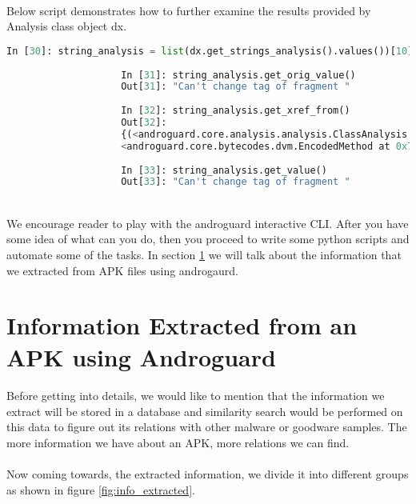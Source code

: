 \documentclass[../main.tex]{subfile}
\begin{document}
			\paragraph{} Below script demonstrates how to further examine the results provided by Analysis class object dx.
				\begin{lstlisting}[language=python]
					In [30]: string_analysis = list(dx.get_strings_analysis().values())[10]
										
					In [31]: string_analysis.get_orig_value()
					Out[31]: "Can't change tag of fragment "
					
					In [32]: string_analysis.get_xref_from()
					Out[32]: 
					{(<androguard.core.analysis.analysis.ClassAnalysis at 0x7fd62588d320>,
					<androguard.core.bytecodes.dvm.EncodedMethod at 0x7fd626197b00>)}
					
					In [33]: string_analysis.get_value()
					Out[33]: "Can't change tag of fragment "
					
				\end{lstlisting}
				
			\paragraph{} We encourage reader to play with the androguard interactive CLI. After you have some idea of what can you do, then you proceed to write some python scripts and automate some of the tasks. In section \ref{sec:androgaurd_static_analysis} we will talk about the information that we extracted from APK files using androgaurd.
			
		
		\section{Information Extracted from an APK using Androguard}\label{sec:androgaurd_static_analysis}
		\paragraph{} Before getting into details, we would like to mention that the information we extract will be stored in a database and similarity search would be performed on this data to figure out its relations with other malware or goodware samples. The more information we have about an APK, more relations we can find.
		\paragraph{} Now coming towards, the extracted information, we divide it into different groups as shown in figure \ref{fig:info_extracted}.
		
\end{document}
